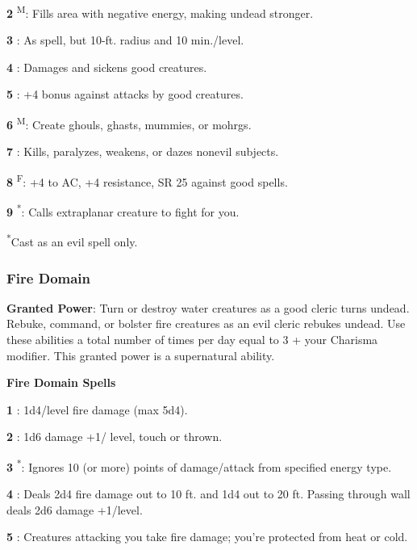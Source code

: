 \textbf{2} \textsuperscript{M}: Fills area with negative energy, making undead stronger.

\textbf{3} : As  spell, but 10-ft. radius and 10 min./level.

\textbf{4} : Damages and sickens good creatures.

\textbf{5} : +4 bonus against attacks by good creatures.

\textbf{6} \textsuperscript{M}: Create ghouls, ghasts, mummies, or mohrgs.

\textbf{7} : Kills, paralyzes, weakens, or dazes nonevil subjects.

\textbf{8} \textsuperscript{F}: +4 to AC, +4 resistance, SR 25 against good spells.

\textbf{9} \textsuperscript{*}: Calls extraplanar creature to fight for you.

\textsuperscript{*}Cast as an evil spell only.

\subsubsection{Fire Domain}

\textbf{Granted Power}: Turn or destroy water creatures as a good cleric turns undead. Rebuke, command, or bolster fire creatures as an evil cleric rebukes undead. Use these abilities a total number of times per day equal to 3 + your Charisma modifier. This granted power is a supernatural ability.

\textbf{Fire Domain Spells}

\textbf{1} : 1d4/level fire damage (max 5d4).

\textbf{2} : 1d6 damage +1/ level, touch or thrown.

\textbf{3} \textsuperscript{*}: Ignores 10 (or more) points of damage/attack from specified energy type.

\textbf{4} : Deals 2d4 fire damage out to 10 ft. and 1d4 out to 20 ft. Passing through wall deals 2d6 damage +1/level.

\textbf{5} : Creatures attacking you take fire damage; you're protected from heat or cold.

